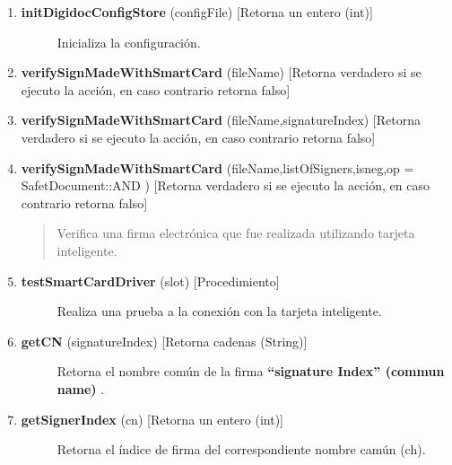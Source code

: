 \documentclass[letterpaper,11pt,spanish]{sphinxmanual}
\begin{document}
\begin{description}
\begin{enumerate}
\begin{description}
\end{description}

\item {} \begin{description}
\item[{\textbf{initDigidocConfigStore} (configFile) {[}Retorna un entero (int){]}}] \leavevmode
Inicializa la configuración.

\end{description}

\item {} 
\textbf{verifySignMadeWithSmartCard} (fileName) {[}Retorna verdadero si se ejecuto la acción, en caso contrario retorna falso{]}

\item {} 
\textbf{verifySignMadeWithSmartCard} (fileName,signatureIndex)  {[}Retorna verdadero si se ejecuto la acción, en caso contrario retorna falso{]}

\item {} 
\textbf{verifySignMadeWithSmartCard} (fileName,listOfSigners,isneg,op = SafetDocument::AND )  {[}Retorna verdadero si se ejecuto la acción, en caso contrario retorna falso{]}
\begin{quote}

Verifica una firma electrónica que fue realizada utilizando tarjeta inteligente.
\end{quote}

\item {} \begin{description}
\item[{\textbf{testSmartCardDriver} (slot) {[}Procedimiento{]}}] \leavevmode
Realiza una prueba a la conexión con la tarjeta inteligente.

\end{description}

\item {} \begin{description}
\item[{\textbf{getCN} (signatureIndex) {[}Retorna cadenas (String){]}}] \leavevmode
Retorna el nombre común de la firma \textbf{``signature Index'' (commun name)} .

\end{description}

\item {} \begin{description}
\item[{\textbf{getSignerIndex} (cn) {[}Retorna un entero (int){]}}] \leavevmode
Retorna el índice de firma del correspondiente nombre camún (ch).


\end{description}
\end{enumerate}
\end{description}
\end{document}
